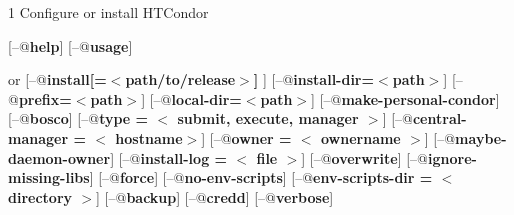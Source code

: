 \begin{ManPage}{\label{man-condor-configure}}{1}
{Configure or install HTCondor}


\Synopsis {}
[\verb@--@\textbf{help}]
[\verb@--@\textbf{usage}]

 or 
[\verb@--@\textbf{install[=$<$path/to/release$>$] }]
[\verb@--@\textbf{install-dir=$<$path$>$}]
[\verb@--@\textbf{prefix=$<$path$>$}]
[\verb@--@\textbf{local-dir=$<$path$>$}]
[\verb@--@\textbf{make-personal-condor}]
[\verb@--@\textbf{bosco}]
[\verb@--@\textbf{type = $<$ submit, execute, manager $>$}]
[\verb@--@\textbf{central-manager = $<$ hostname$>$}]
[\verb@--@\textbf{owner = $<$ ownername $>$}]
[\verb@--@\textbf{maybe-daemon-owner}]
[\verb@--@\textbf{install-log = $<$ file $>$}]
[\verb@--@\textbf{overwrite}]
[\verb@--@\textbf{ignore-missing-libs}]
[\verb@--@\textbf{force}]
[\verb@--@\textbf{no-env-scripts}]
[\verb@--@\textbf{env-scripts-dir = $<$ directory $>$}]
[\verb@--@\textbf{backup}]
[\verb@--@\textbf{credd}]
[\verb@--@\textbf{verbose}]






\end{ManPage}

